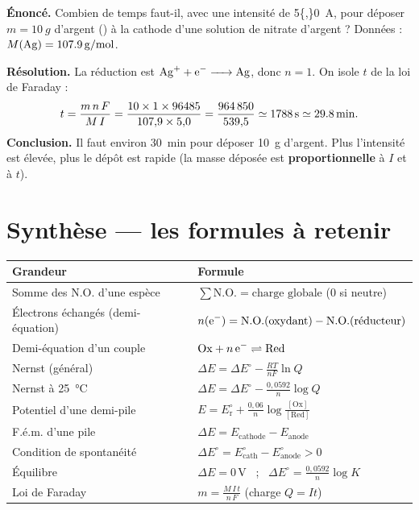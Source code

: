 \documentclass[11pt,a4paper]{article}
\newcommand{\NO}{\ensuremath{\mathrm{N.O.}}}    %
\newcommand{\fem}{\ensuremath{\Delta E}}        %
\begin{document}
\begin{exemple}
\textbf{Énoncé.} Combien de temps faut-il, avec une intensité de \SI{5{,}0}{A}, pour déposer
$m=\SI{10}{g}$ d'argent () à la cathode d'une solution de nitrate d'argent  ?
Données : $M(\ce{Ag})=\SI{107{,}9}{g\per mol}$.

\textbf{Résolution.} La réduction est $\ce{Ag+ + e^- -> Ag}$, donc $n=1$. On isole $t$ de la loi de
Faraday :
\[
t=\frac{m\,n\,F}{M\,I}=\frac{10\times1\times96485}{107{,}9\times5{,}0}
=\frac{964\,850}{539{,}5}\simeq\SI{1788}{s}\simeq\SI{29{,}8}{min}.
\]
\textbf{Conclusion.} Il faut environ \SI{30}{min} pour déposer \SI{10}{g} d'argent. Plus l'intensité
est élevée, plus le dépôt est rapide (la masse déposée est \textbf{proportionnelle} à $I$ et à $t$).
\end{exemple}

\section*{Synthèse — les formules à retenir}
\setcounter{section}{7}

\begin{tcolorbox}[boxbase,colback=formulacol!5,colframe=formulacol,
   title={\textsc{Récapitulatif des formules de la fiche}}]
\renewcommand{\arraystretch}{1.7}
\begin{tabular}{@{}p{7.6cm} p{7.0cm}@{}}
\textbf{Grandeur} & \textbf{Formule}\\
\midrule
Somme des $\NO$ d'une espèce & $\displaystyle\sum\NO=\text{charge globale}$ (0 si neutre)\\
Électrons échangés (demi-équation) & $\displaystyle n(\ce{e^-})=\NO(\text{oxydant})-\NO(\text{réducteur})$\\
Demi-équation d'un couple & $\mathrm{Ox}+n\,\ce{e^-}\rightleftharpoons\mathrm{Red}$\\
Nernst (général) & $\displaystyle\fem=\fem^{\circ}-\frac{RT}{nF}\ln Q$\\
Nernst à \SI{25}{\celsius} & $\displaystyle\fem=\fem^{\circ}-\frac{0{,}0592}{n}\log Q$\\
Potentiel d'une demi-pile & $\displaystyle E=E_{\mathrm{r}}^{\circ}+\frac{0{,}06}{n}\log\frac{[\mathrm{Ox}]}{[\mathrm{Red}]}$\\
F.é.m. d'une pile & $\fem=E_{\text{cathode}}-E_{\text{anode}}$\\
Condition de spontanéité & $\fem^{\circ}=E_{\text{cath}}^{\circ}-E_{\text{anode}}^{\circ}>0$\\
Équilibre & $\fem=0$\,V \ ; \ $\fem^{\circ}=\tfrac{0{,}0592}{n}\log K$\\
Loi de Faraday & $\displaystyle m=\frac{M\,I\,t}{n\,F}$ \quad (charge $Q=It$)\\
\end{tabular}
\end{tcolorbox}
\end{document}
